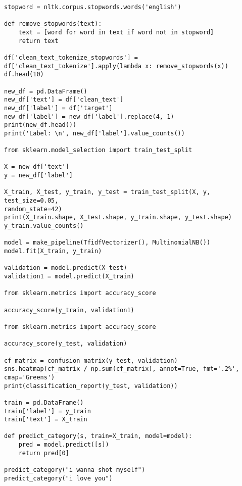 \begin{lstlisting}
stopword = nltk.corpus.stopwords.words('english')

def remove_stopwords(text):
    text = [word for word in text if word not in stopword]
    return text

df['clean_text_tokenize_stopwords'] = 
df['clean_text_tokenize'].apply(lambda x: remove_stopwords(x))
df.head(10)

new_df = pd.DataFrame()
new_df['text'] = df['clean_text']
new_df['label'] = df['target']
new_df['label'] = new_df['label'].replace(4, 1)
print(new_df.head())
print('Label: \n', new_df['label'].value_counts())

from sklearn.model_selection import train_test_split

X = new_df['text']
y = new_df['label']

X_train, X_test, y_train, y_test = train_test_split(X, y, test_size=0.05,
random_state=42)
print(X_train.shape, X_test.shape, y_train.shape, y_test.shape)
y_train.value_counts()

model = make_pipeline(TfidfVectorizer(), MultinomialNB())
model.fit(X_train, y_train)

validation = model.predict(X_test)
validation1 = model.predict(X_train)

from sklearn.metrics import accuracy_score

accuracy_score(y_train, validation1)

from sklearn.metrics import accuracy_score

accuracy_score(y_test, validation)

cf_matrix = confusion_matrix(y_test, validation)
sns.heatmap(cf_matrix / np.sum(cf_matrix), annot=True, fmt='.2%', cmap='Greens')
print(classification_report(y_test, validation))

train = pd.DataFrame()
train['label'] = y_train
train['text'] = X_train

def predict_category(s, train=X_train, model=model):
    pred = model.predict([s])
    return pred[0]

predict_category("i wanna shot myself")
predict_category("i love you")


\end{lstlisting}
